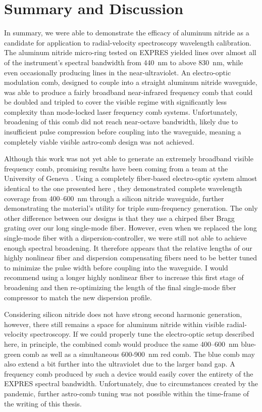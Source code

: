 \section{Summary and Discussion}

In summary, we were able to demonstrate the efficacy of aluminum nitride as a candidate for application to radial-velocity spectroscopy wavelength calibration. The aluminum nitride micro-ring tested on EXPRES yielded lines over almost all of the instrument's spectral bandwidth from 440~\si{\nano\meter} to above 830~\si{\nano\meter}, while even occasionally producing lines in the near-ultraviolet. An electro-optic modulation comb, designed to couple into a straight aluminum nitride waveguide, was able to produce a fairly broadband near-infrared frequency comb that could be doubled and tripled to cover the visible regime with significantly less complexity than mode-locked laser frequency comb systems. Unfortunately, broadening of this comb did not reach near-octave bandwidth, likely due to insufficient pulse compression before coupling into the waveguide, meaning a completely viable visible astro-comb design was not achieved.

Although this work was not yet able to generate an extremely broadband visible frequency comb, promising results have been coming from a team at the University of Geneva \citep{obrzud_visible_2019}. Using a completely fiber-based electro-optic system almost identical to the one presented here \citep{obrzud_microphotonic_2019}, they demonstrated complete wavelength coverage from 400--600~\si{\nano\meter} through a silicon nitride waveguide, further demonstrating the material's utility for triple sum-frequency generation. The only other difference between our designs is that they use a chirped fiber Bragg grating over our long single-mode fiber. However, even when we replaced the long single-mode fiber with a dispersion-controller, we were still not able to achieve enough spectral broadening. It therefore appears that the relative lengths of our highly nonlinear fiber and dispersion compensating fibers need to be better tuned to minimize the pulse width before coupling into the waveguide. I would recommend using a longer highly nonlinear fiber to increase this first stage of broadening and then re-optimizing the length of the final single-mode fiber compressor to match the new dispersion profile.

Considering silicon nitride does not have strong second harmonic generation, however, there still remains a space for aluminum nitride within visible radial-velocity spectroscopy. If we could properly tune the electro-optic setup described here, in principle, the combined comb would produce the same 400--600~\si{\nano\meter} blue-green comb as well as a simultaneous 600-900~\si{\nano\meter} red comb. The blue comb may also extend a bit further into the ultraviolet due to the larger band gap. A frequency comb produced by such a device would easily cover the entirety of the EXPRES spectral bandwidth. Unfortunately, due to circumstances created by the pandemic, further astro-comb tuning was not possible within the time-frame of the writing of this thesis.

